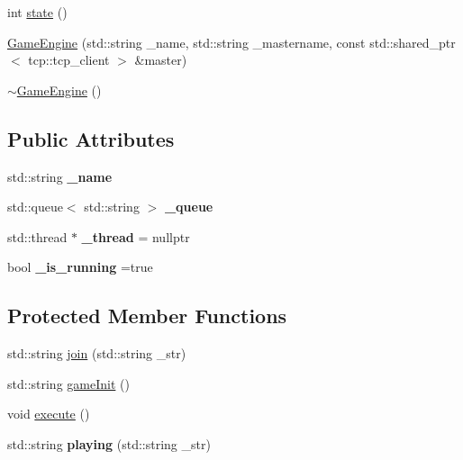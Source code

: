 \begin{DoxyCompactItemize}
\item 
int \hyperlink{classGameEngine_a2efeb330b4e8c23aaeaf9928ae068301}{state} ()
\item 
\hyperlink{classGameEngine_a7ef964f05589c5440d7d06ad3aa3ee16}{Game\+Engine} (std\+::string \+\_\+name, std\+::string \+\_\+mastername, const std\+::shared\+\_\+ptr$<$ tcp\+::tcp\+\_\+client $>$ \&master)
\item 
\hyperlink{classGameEngine_a8e59d8341ef9d2dcc62eee1437e37f14}{$\sim$\+Game\+Engine} ()
\end{DoxyCompactItemize}
\subsection*{Public Attributes}
\begin{DoxyCompactItemize}
\item 
std\+::string {\bfseries \+\_\+name}\hypertarget{classGameEngine_ad405ac36f2e3560b693e1d417a240df3}{}\label{classGameEngine_ad405ac36f2e3560b693e1d417a240df3}

\item 
std\+::queue$<$ std\+::string $>$ {\bfseries \+\_\+queue}\hypertarget{classGameEngine_abff9f93c1407c61f310dccc2f4da6e83}{}\label{classGameEngine_abff9f93c1407c61f310dccc2f4da6e83}

\item 
std\+::thread $\ast$ {\bfseries \+\_\+thread} = nullptr\hypertarget{classGameEngine_aaf3a9ff9ff49b63d0ab1713ee5e24cfe}{}\label{classGameEngine_aaf3a9ff9ff49b63d0ab1713ee5e24cfe}

\item 
bool {\bfseries \+\_\+is\+\_\+running} =true\hypertarget{classGameEngine_abc77225c528e453428f41b44c868a2e0}{}\label{classGameEngine_abc77225c528e453428f41b44c868a2e0}

\end{DoxyCompactItemize}
\subsection*{Protected Member Functions}
\begin{DoxyCompactItemize}
\item 
std\+::string \hyperlink{classGameEngine_aa9493de5dbf8e1c08451052820333858}{join} (std\+::string \+\_\+str)
\item 
std\+::string \hyperlink{classGameEngine_a65d1f7b9fac5c0e6f52eadfaed7da4e7}{game\+Init} ()
\item 
void \hyperlink{classGameEngine_a31a36085b12f19b0b163b3997188154c}{execute} ()
\item 
std\+::string {\bfseries playing} (std\+::string \+\_\+str)\hypertarget{classGameEngine_ab48f3a94eabf908c8daed33b07d97b56}{}\label{classGameEngine_ab48f3a94eabf908c8daed33b07d97b56}

\end{DoxyCompactItemize}


